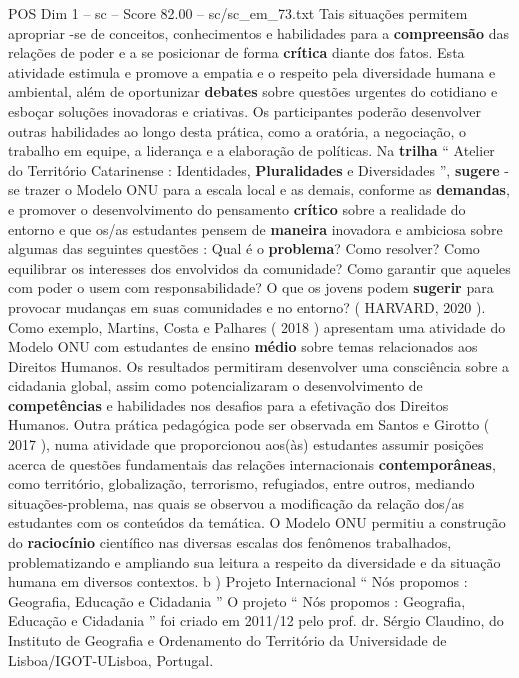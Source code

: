 \begin{textsample}{POS Dim 1 – sc – Score 82.00 – sc/sc\_em\_73.txt}
Tais situações permitem apropriar -se de conceitos, conhecimentos e habilidades para a \textbf{compreensão} das relações de poder e a se posicionar de forma \textbf{crítica} diante dos fatos.
Esta atividade estimula e promove a empatia e o respeito pela diversidade humana e ambiental, além de oportunizar \textbf{debates} sobre questões urgentes do cotidiano e esboçar soluções inovadoras e criativas.
Os participantes poderão desenvolver outras habilidades ao longo desta prática, como a oratória, a negociação, o trabalho em equipe, a liderança e a elaboração de políticas.
Na \textbf{trilha} “ Atelier do Território Catarinense : Identidades, \textbf{Pluralidades} e Diversidades ”, \textbf{sugere} -se trazer o Modelo ONU para a escala local e as demais, conforme as \textbf{demandas}, e promover o desenvolvimento do pensamento \textbf{crítico} sobre a realidade do entorno e que os/as estudantes pensem de \textbf{maneira} inovadora e ambiciosa sobre algumas das seguintes questões : Qual é o \textbf{problema}?
Como resolver?
Como equilibrar os interesses dos envolvidos da comunidade?
Como garantir que aqueles com poder o usem com responsabilidade?
O que os jovens podem \textbf{sugerir} para provocar mudanças em suas comunidades e no entorno? ( HARVARD, 2020 ).
Como exemplo, Martins, Costa e Palhares ( 2018 ) apresentam uma atividade do Modelo ONU com estudantes de ensino \textbf{médio} sobre temas relacionados aos Direitos Humanos.
Os resultados permitiram desenvolver uma consciência sobre a cidadania global, assim como potencializaram o desenvolvimento de \textbf{competências} e habilidades nos desafios para a efetivação dos Direitos Humanos.
Outra prática pedagógica pode ser observada em Santos e Girotto ( 2017 ), numa atividade que proporcionou aos(às) estudantes assumir posições acerca de questões fundamentais das relações internacionais \textbf{contemporâneas}, como território, globalização, terrorismo, refugiados, entre outros, mediando situações-problema, nas quais se observou a modificação da relação dos/as estudantes com os conteúdos da temática.
O Modelo ONU permitiu a construção do \textbf{raciocínio} científico nas diversas escalas dos fenômenos trabalhados, problematizando e ampliando sua leitura a respeito da diversidade e da situação humana em diversos contextos. b ) Projeto Internacional “ Nós propomos : Geografia, Educação e Cidadania ” O projeto “ Nós propomos : Geografia, Educação e Cidadania ” foi criado em 2011/12 pelo prof. dr.
Sérgio Claudino, do Instituto de Geografia e Ordenamento do Território da Universidade de Lisboa/IGOT-ULisboa, Portugal.

\end{textsample}
